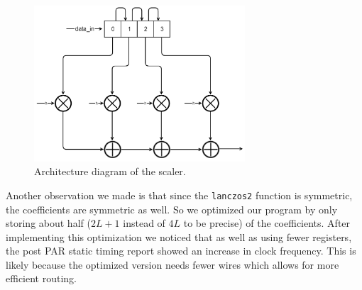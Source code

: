\begin{figure}
\begin{center}
\includegraphics[width=0.7\textwidth]{images/architecture.png}
\caption{Architecture diagram of the scaler.}
\label{fig:arch}
\end{center}
\end{figure}

Another observation we made is that since the \texttt{lanczos2} function is symmetric, the coefficients are symmetric as well. So we optimized our program by only storing about half ($2L+1$ instead of $4L$ to be precise) of the coefficients. After implementing this optimization we noticed that as well as using fewer registers, the post PAR static timing report showed an increase in clock frequency. This is likely because the optimized version needs fewer wires which allows for more efficient routing.

